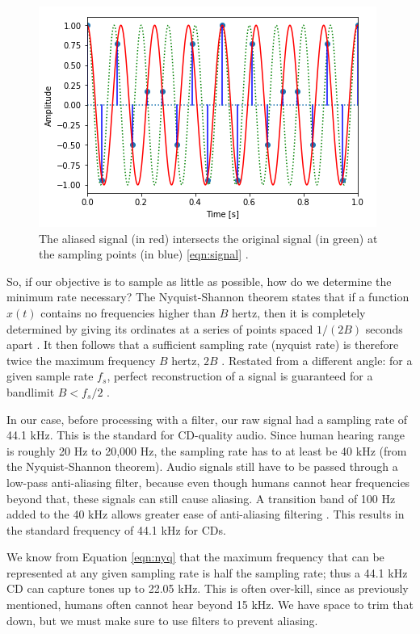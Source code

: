 \begin{figure}[H]
	\centering
	\includegraphics[scale = 1]{images/aliased_curve.png} %
	
 \caption{
	The aliased signal (in red) intersects the original
 	signal (in green) at the sampling points (in blue)
	\ref{eqn:signal} \cite{notebook:sampling}.
	} 
 	\label{fig:aliase}  
 \end{figure}

So, if our objective is to sample as little as possible, how do
we determine the minimum rate necessary? The Nyquist-Shannon theorem states that if a function $x ( t )$ contains no
frequencies higher than $B$ hertz, then it is completely determined by
giving its ordinates at a series of points spaced $1 / ( 2 B )$
seconds apart \cite{shannon:wiki}. It then follows that a sufficient sampling rate (nyquist rate) is therefore twice the maximum frequency $B$ hertz, $2B$ \cite{shannon:wiki}.
Restated from a different angle: for a given sample rate $f_{s}$, perfect reconstruction of a signal is guaranteed for a bandlimit $B<f_{s}/2$ \cite{shannon:wiki}.


In our case, before processing with a filter, our raw signal had
a sampling rate of 44.1 kHz. This is the standard for CD-quality
audio. Since human hearing range is roughly 20 Hz to 20,000 Hz, the sampling rate has to at least be 40 kHz (from the Nyquist-Shannon theorem). Audio signals still have to be passed through a low-pass anti-aliasing filter, because even though humans cannot hear frequencies beyond that, these signals can still cause aliasing. A transition band of 100 Hz added to the 40 kHz allows greater ease of anti-aliasing filtering \cite{cd:wiki}. This results in the standard frequency of 44.1 kHz for CDs.



We know from Equation \ref{eqn:nyq} that the maximum
frequency that can be represented at any given sampling rate is
half the sampling rate; thus a 44.1 kHz CD can capture tones up
to 22.05 kHz. This is often over-kill, since as previously
mentioned, humans often cannot hear beyond 15 kHz. We have space
to trim that down, but we must make sure to use filters to
prevent aliasing.
